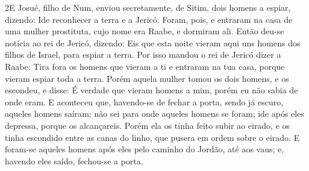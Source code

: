 \medskip

\lettrine{2} E Josué, filho de Num, enviou secretamente, de
Sitim, dois homens a espiar, dizendo: Ide reconhecer a terra e a
Jericó. Foram, pois, e entraram na casa de uma mulher prostituta,
cujo nome era Raabe, e dormiram ali. Então deu-se notícia ao rei
de Jericó, dizendo: Eis que esta noite vieram aqui uns homens dos
filhos de Israel, para espiar a terra. Por isso mandou o rei de
Jericó dizer a Raabe: Tira fora os homens que vieram a ti e entraram
na tua casa, porque vieram espiar toda a terra. Porém aquela
mulher tomou os dois homens, e os escondeu, e disse: É verdade que
vieram homens a mim, porém eu não sabia de onde eram. E
aconteceu que, havendo-se de fechar a porta, sendo já escuro,
aqueles homens saíram; não sei para onde aqueles homens se foram;
ide após eles depressa, porque os alcançareis. Porém ela os
tinha feito subir ao eirado, e os tinha escondido entre as canas do
linho, que pusera em ordem sobre o eirado. E foram-se aqueles
homens após eles pelo caminho do Jordão, até aos vaus; e, havendo
eles saído, fechou-se a porta.

